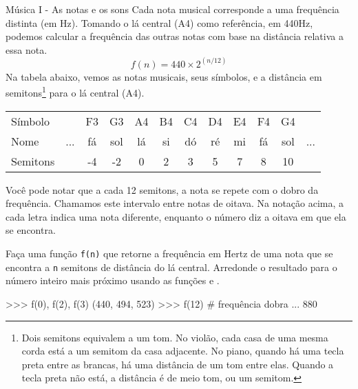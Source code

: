 	\begin{problem}{Música I - As notas e os sons}
		Cada nota musical corresponde a uma frequência distinta (em Hz). Tomando o lá central (A4) como referência, em 440Hz, podemos calcular a frequência das outras notas com base na distância relativa a essa nota.
        $$f(n) = 440 \times 2^{(n/12)}$$
        Na tabela abaixo, vemos as notas musicais, seus símbolos, e a distância em semitons\footnote{Dois semitons equivalem a um tom. No violão, cada casa de uma mesma corda está a um semitom da casa adjacente. No piano, quando há uma tecla preta entre as brancas, há uma distância de um tom entre elas. Quando a tecla preta não está, a distância é de meio tom, ou um semitom.} para o lá central (A4).

		\begin{center}
            \begin{tabular}{|l|c c c c c c c c c c c|}
                \hline
                Símbolo &  & F3 & G3 & A4 & B4 & C4 & D4 & E4 & F4 & G4 & \\
                Nome & ... & fá & sol & lá & si & dó & ré & mi & fá & sol &  ... \\
                Semitons &  & -4 & -2 & 0 & 2 & 3 & 5 & 7 & 8 & 10 & \\
                \hline
            \end{tabular}
        \end{center}

		Você pode notar que a cada 12 semitons, a nota se repete com o dobro da frequência. Chamamos este intervalo entre notas de oitava. Na notação acima, a cada letra indica uma nota diferente, enquanto o número diz a oitava em que ela se encontra. \par
        
		\proposal
        Faça uma função \texttt{f(n)} que retorne a frequência em Hertz de uma nota que se encontra a \texttt{n} semitons de distância do lá central. Arredonde o resultado para o número inteiro mais próximo usando as funções  e . \par
        
        \begin{lstpython}
	>>> f(0), f(2), f(3)
	(440, 494, 523)
	>>> f(12) # frequência dobra ...
	880
        \end{lstpython}
	\end{problem}

